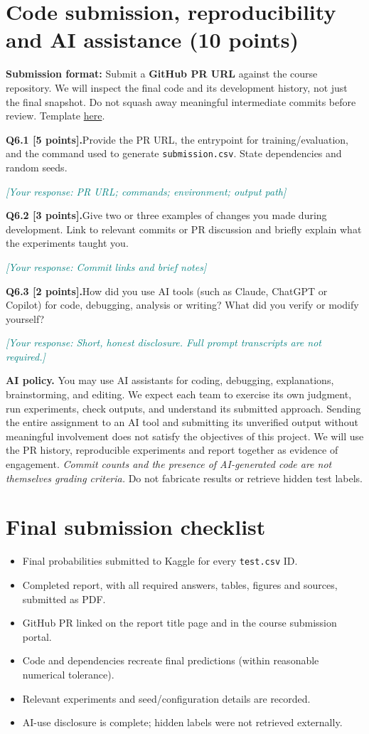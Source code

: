\documentclass[11pt,letterpaper]{article}
\newcommand{\placeholder}[1]{\par\noindent\textcolor{teal}{\textit{[Your response: #1]}}\par\vspace{0.3em}}
\newcommand{\question}[2]{\needspace{4\baselineskip}\par\addvspace{0.45em}\noindent\textbf{#1}\quad #2\par\nobreak\vspace{0.1em}}
\begin{document}
\section{Code submission, reproducibility and AI assistance (10 points)}
\textbf{Submission format:} Submit a \textbf{GitHub PR URL} against the course repository. We will inspect the final code and its development history, not just the final snapshot. Do not squash away meaningful intermediate commits before review. Template \href{https://github.com/sekhari/human-or-ai-submissions}{here}.

\question{Q6.1 [5 points].}{Provide the PR URL, the entrypoint for training/evaluation, and the command used to generate \texttt{submission.csv}. State dependencies and random seeds.}
\placeholder{PR URL; commands; environment; output path}
\question{Q6.2 [3 points].}{Give two or three examples of changes you made during development. Link to relevant commits or PR discussion and briefly explain what the experiments taught you.}
\placeholder{Commit links and brief notes}
\question{Q6.3 [2 points].}{How did you use AI tools (such as Claude, ChatGPT or Copilot) for code, debugging, analysis or writing? What did you verify or modify yourself?}
\placeholder{Short, honest disclosure. Full prompt transcripts are not required.}

\textbf{AI policy.} You may use AI assistants for coding, debugging, explanations, brainstorming, and editing. We expect each team to exercise its own judgment, run experiments, check outputs, and understand its submitted approach. Sending the entire assignment to an AI tool and submitting its unverified output without meaningful involvement does not satisfy the objectives of this project. We will use the PR history, reproducible experiments and report together as evidence of engagement. \emph{Commit counts and the presence of AI-generated code are not themselves grading criteria.} Do not fabricate results or retrieve hidden test labels.


\section*{Final submission checklist}
\begin{itemize}[label=$\square$]
\item Final probabilities submitted to Kaggle for every \texttt{test.csv} ID.
\item Completed report, with all required answers, tables, figures and sources, submitted as PDF.
\item GitHub PR linked on the report title page and in the course submission portal.
\item Code and dependencies recreate final predictions (within reasonable numerical tolerance).
\item Relevant experiments and seed/configuration details are recorded.
\item AI-use disclosure is complete; hidden labels were not retrieved externally.
\end{itemize}
\end{document}
